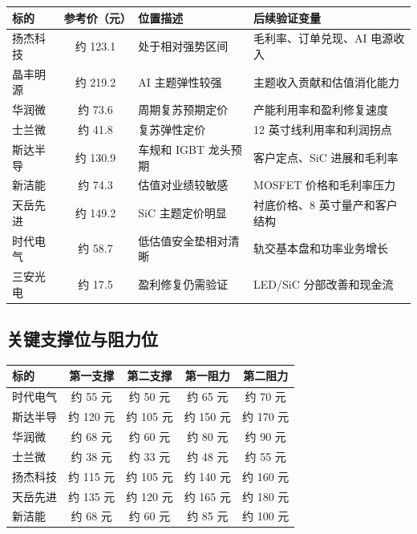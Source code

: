 \begin{exhibitbox}[表 9-10：核心标的价格位置监测表]
\centering
\small
\begin{tabularx}{\exhibitboxwidth}{L{2.1cm} c L{3.0cm} X}
\toprule
\textbf{标的} & \textbf{参考价（元）} & \textbf{位置描述} & \textbf{后续验证变量} \\
\midrule
扬杰科技 & 约 123.1 & 处于相对强势区间 & 毛利率、订单兑现、AI 电源收入 \\
晶丰明源 & 约 219.2 & AI 主题弹性较强 & 主题收入贡献和估值消化能力 \\
华润微 & 约 73.6 & 周期复苏预期定价 & 产能利用率和盈利修复速度 \\
士兰微 & 约 41.8 & 复苏弹性定价 & 12 英寸线利用率和利润拐点 \\
斯达半导 & 约 130.9 & 车规和 IGBT 龙头预期 & 客户定点、SiC 进展和毛利率 \\
新洁能 & 约 74.3 & 估值对业绩较敏感 & MOSFET 价格和毛利率压力 \\
天岳先进 & 约 149.2 & SiC 主题定价明显 & 衬底价格、8 英寸量产和客户结构 \\
时代电气 & 约 58.7 & 低估值安全垫相对清晰 & 轨交基本盘和功率业务增长 \\
三安光电 & 约 17.5 & 盈利修复仍需验证 & LED/SiC 分部改善和现金流 \\
\bottomrule
\end{tabularx}
\end{exhibitbox}

\subsection{关键支撑位与阻力位}

\begin{exhibitbox}[表 9-11：核心标的关键价格位监测表]
\centering
\footnotesize
\begin{tabularx}{\exhibitboxwidth}{L{1.8cm} c c c c}
\toprule
\textbf{标的} & \textbf{第一支撑} & \textbf{第二支撑} & \textbf{第一阻力} & \textbf{第二阻力} \\
\midrule
时代电气 & 约 55 元 & 约 50 元 & 约 65 元 & 约 70 元 \\
斯达半导 & 约 120 元 & 约 105 元 & 约 150 元 & 约 170 元 \\
华润微 & 约 68 元 & 约 60 元 & 约 80 元 & 约 90 元 \\
士兰微 & 约 38 元 & 约 33 元 & 约 48 元 & 约 55 元 \\
扬杰科技 & 约 115 元 & 约 105 元 & 约 140 元 & 约 160 元 \\
天岳先进 & 约 135 元 & 约 120 元 & 约 165 元 & 约 180 元 \\
新洁能 & 约 68 元 & 约 60 元 & 约 85 元 & 约 100 元 \\
\bottomrule
\end{tabularx}
\end{exhibitbox}

